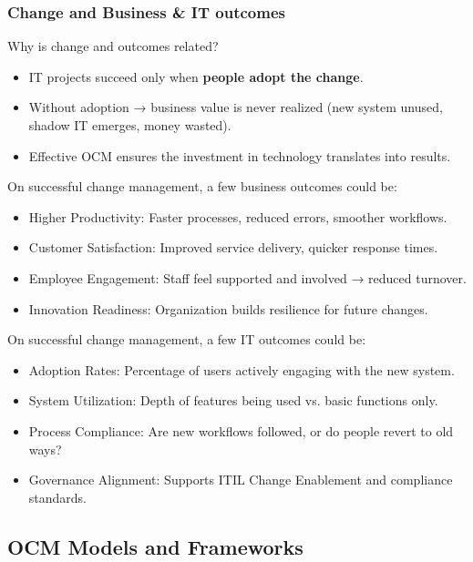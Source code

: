 \subsubsection{Change and Business \& IT outcomes}

\indent

\noindent Why is change and outcomes related?

\begin{itemize}
    \item IT projects succeed only when \textbf{people adopt the change}.
    \item Without adoption → business value is never realized (new system unused, shadow IT emerges, money wasted).
    \item Effective OCM ensures the investment in technology translates into results.
\end{itemize}

\bigskip 

\noindent On successful change management, a few business outcomes could be:

\begin{itemize}
    \item Higher Productivity: Faster processes, reduced errors, smoother workflows.
    \item Customer Satisfaction: Improved service delivery, quicker response times.
    \item Employee Engagement: Staff feel supported and involved → reduced turnover.
    \item Innovation Readiness: Organization builds resilience for future changes.
\end{itemize}

\bigskip On successful change management, a few IT outcomes could be:

\begin{itemize}
    \item Adoption Rates: Percentage of users actively engaging with the new system.
    \item System Utilization: Depth of features being used vs. basic functions only.
    \item Process Compliance: Are new workflows followed, or do people revert to old ways?
    \item Governance Alignment: Supports ITIL Change Enablement and compliance standards.
\end{itemize}

\subsection{OCM Models and Frameworks}

